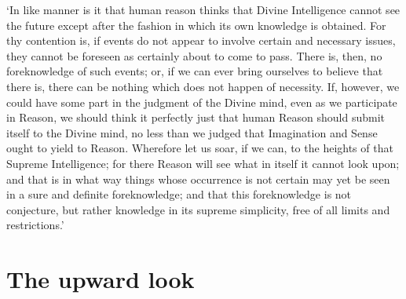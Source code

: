 \documentclass[11pt]{book}
\begin{document}
`In like manner is it that human reason thinks that Divine Intelligence
cannot see the future except after the fashion in which its own
knowledge is obtained. For thy contention is, if events do not appear to
involve certain and necessary issues, they cannot be foreseen as
certainly about to come to pass. There is, then, no foreknowledge of
such events; or, if we can ever bring ourselves to believe that there
is, there can be nothing which does not happen of necessity. If,
however, we could have some part in the judgment of the Divine mind,
even as we participate in Reason, we should think it perfectly just that
human Reason should submit itself to the Divine mind, no less than we
judged that Imagination and Sense ought to yield to Reason. Wherefore
let us soar, if we can, to the heights of that Supreme Intelligence; for
there Reason will see what in itself it cannot look upon; and that is in
what way things whose occurrence is not certain may yet be seen in a
sure and definite foreknowledge; and that this foreknowledge is not
conjecture, but rather knowledge in its supreme simplicity, free of all
limits and restrictions.'



\section{The upward look}
\end{document}
